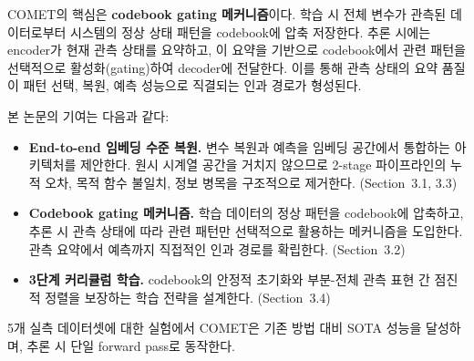 COMET의 핵심은 \textbf{codebook gating 메커니즘}이다. 학습 시 전체 변수가 관측된 데이터로부터 시스템의 정상 상태 패턴을 codebook에 압축 저장한다. 추론 시에는 encoder가 현재 관측 상태를 요약하고, 이 요약을 기반으로 codebook에서 관련 패턴을 선택적으로 활성화(gating)하여 decoder에 전달한다. 이를 통해 관측 상태의 요약 품질이 패턴 선택, 복원, 예측 성능으로 직결되는 인과 경로가 형성된다.

본 논문의 기여는 다음과 같다:
\begin{itemize}
  \item \textbf{End-to-end 임베딩 수준 복원.} 변수 복원과 예측을 임베딩 공간에서 통합하는 아키텍처를 제안한다. 원시 시계열 공간을 거치지 않으므로 2-stage 파이프라인의 누적 오차, 목적 함수 불일치, 정보 병목을 구조적으로 제거한다. (Section~3.1, 3.3)
  \item \textbf{Codebook gating 메커니즘.} 학습 데이터의 정상 패턴을 codebook에 압축하고, 추론 시 관측 상태에 따라 관련 패턴만 선택적으로 활용하는 메커니즘을 도입한다. 관측 요약에서 예측까지 직접적인 인과 경로를 확립한다. (Section~3.2)
  \item \textbf{3단계 커리큘럼 학습.} codebook의 안정적 초기화와 부분-전체 관측 표현 간 점진적 정렬을 보장하는 학습 전략을 설계한다. (Section~3.4)
\end{itemize}

5개 실측 데이터셋에 대한 실험에서 COMET은 기존 방법 대비 SOTA 성능을 달성하며, 추론 시 단일 forward pass로 동작한다.
